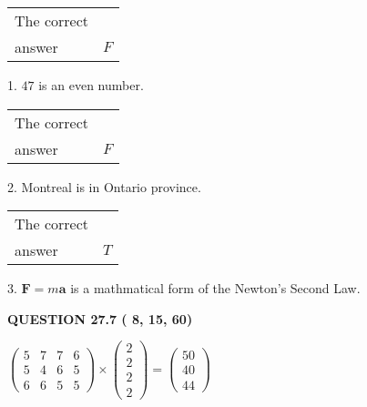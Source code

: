 \documentclass[12pt]{article}
\begin{document}
  
 
 
\noindent{}

 
\noindent\begin{tabular}{|l|l|}\hline The correct & \\
          answer &  %
$F$ \\ \hline \end{tabular}
1. $ %
47$ is an  %
even number.
 
\noindent\begin{tabular}{|l|l|}\hline The correct & \\
          answer &  %
$F$ \\ \hline \end{tabular}
2.  %
Montreal is in  %
Ontario province.
 
\noindent\begin{tabular}{|l|l|}\hline The correct & \\
          answer &  %
$T$ \\ \hline \end{tabular}
3.  %
$\mathbf{F}=m\mathbf{a}$ is a mathmatical form of  %
the Newton's Second Law.
 
 
 
  
\vspace{0.2in}
  
{\textbf{\Large{QUESTION
27.7 
 (          8,         15,         60)
}}}
  
  
 
 
\noindent{}

 
$\left( \begin{array}{ccccccccccccccc}
           5 & 
           7 & 
           7 & 
           6 \\ 
           5 & 
           4 & 
           6 & 
           5 \\ 
           6 & 
           6 & 
           5 & 
           5
\end{array}\right) \times
\left( \begin{array}{c}
           2 \\ 
           2 \\ 
           2 \\ 
           2
\end{array}\right)  =
\left( \begin{array}{c}
          50 \\ 
          40 \\ 
          44
\end{array}\right)  $
 
\end{document}
